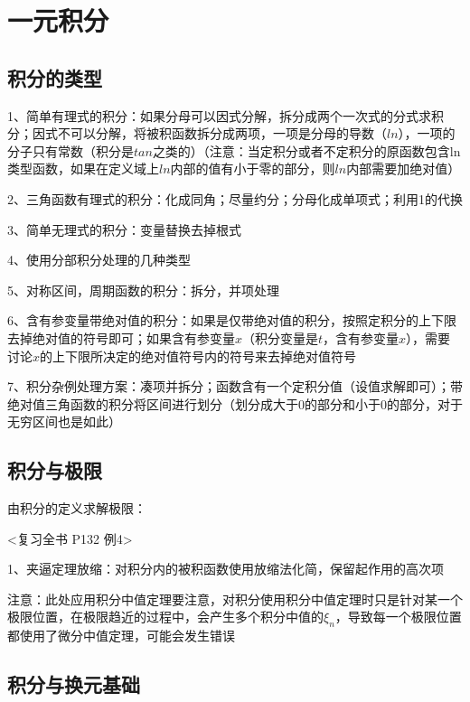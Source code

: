 \chapter{一元积分}

\section{积分的类型}

1、简单有理式的积分：如果分母可以因式分解，拆分成两个一次式的分式求积分；因式不可以分解，将被积函数拆分成两项，一项是分母的导数（$ln$），一项的分子只有常数（积分是$tan$之类的）（注意：当定积分或者不定积分的原函数包含ln类型函数，如果在定义域上$ln$内部的值有小于零的部分，则$ln$内部需要加绝对值）

2、三角函数有理式的积分：化成同角；尽量约分；分母化成单项式；利用1的代换

3、简单无理式的积分：变量替换去掉根式

4、使用分部积分处理的几种类型

5、对称区间，周期函数的积分：拆分，并项处理

6、含有参变量带绝对值的积分：如果是仅带绝对值的积分，按照定积分的上下限去掉绝对值的符号即可；如果含有参变量$x$（积分变量是$t$，含有参变量$x$），需要讨论$x$的上下限所决定的绝对值符号内的符号来去掉绝对值符号

7、积分杂例处理方案：凑项并拆分；函数含有一个定积分值（设值求解即可）；带绝对值三角函数的积分将区间进行划分（划分成大于0的部分和小于0的部分，对于无穷区间也是如此）

\section{积分与极限}

由积分的定义求解极限：

<复习全书 P132 例4>

1、夹逼定理放缩：对积分内的被积函数使用放缩法化简，保留起作用的高次项

注意：此处应用积分中值定理要注意，对积分使用积分中值定理时只是针对某一个极限位置，在极限趋近的过程中，会产生多个积分中值的$\xi_n$，导致每一个极限位置都使用了微分中值定理，可能会发生错误

\section{积分与换元基础}



